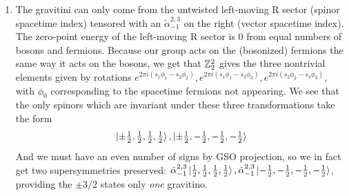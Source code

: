 \documentclass[11pt, class=article, crop=false]{standalone}
\begin{document}
\begin{enumerate}
	To obtain a nonzero result we thus need to act with $\d_\nu^2$. On these terms for each $h,g$. First note that for $h=g=0$ \eqref{eq:thetaid} vanishes as $\nu^4$ so will not contribute. For $(h,g) \neq (0,0)$, the terms vanish as $\nu^2$ due to the $\theta^2 \twist11$, exactly cancellable by taking two derivatives on that term. Thus, we need only worry about the zeroth order behavior of everything else: $\xi \sim 1$ and $\theta\twist{1-h}{1-g} \theta \twist{1+h}{1+g} (\nu/2) \sim \theta\twist{1-h}{1-g} \theta \twist{1+h}{1+g} (0)$. We are left with 
	\[
	\begin{aligned}
		&-\frac{\pi^2}{4} \frac{1}{(2 \pi)^2} \frac12 \sum_{h,g \neq (0,0)} \frac{\Gamma_{2,18} \twist hg}{\tau_2 \eta^{8} \bar \eta^{20}} \frac{ 16 \eta^2 \bar \eta^2}{\theta^2 \twist{1-h}{1-g} \bar \theta^2 \twist{1-h}{1-g}} \theta\twist{1-h}{1-g} \theta \twist{1+h}{1+g} \big(\d_\nu \theta \twist11_{\nu = 0}\big)^2\\
		&= -\frac{4 \eta^6}{2 \tau_2 \eta^6 \bar \eta^{18}} \left[\frac{\Gamma_{2,18} \twist11 }{\bar \theta^2 \twist00} + \frac{\Gamma_{2,18} \twist10 }{\bar \theta^2 \twist01} -
		\frac{\Gamma_{2,18} \twist01 }{\bar \theta^2 \twist10} \right]
	\end{aligned}
	\]
	Where we have used $\theta \twist 12 = - \theta \twist10$, as well as $\theta_1'|_{\nu = 0} = 2 \eta^3$ 
	We now use the identity
	\[
		\bar \theta_2 \bar \theta_3 \bar \theta_4 = 2 \bar \eta^3
	\]
	
	and recover
	\[
		\tau_2 B_2 = - \frac{\Gamma_{2,18} \twist11 \bar \theta_2 \bar \theta_3}{\bar \eta^{24}} - \frac{ \Gamma_{2,18} \twist 10 \bar \theta_2 \bar \theta_3}{\bar \eta^{24}} +\frac{ \Gamma_{2,18} \twist 01 \bar \theta_3 \bar \theta_4}{\bar \eta^{24}}.
	\]
	
	\item The gravitini can only come from the untwisted left-moving R sector (spinor spacetime index) tensored with an $\tilde \alpha^{2,3}_{-1}$ on the right (vector spacetime index). The zero-point energy of the left-moving R sector is $0$ from equal numbers of bosons and fermions. Because our group acts on the (bosonized) fermions the same way it acts on the bosons, we get that $\mathbb{Z}_2^2$ gives the three nontrivial elements given by rotations $e^{2 \pi i (s_1 \phi_1 - s_2 \phi_2)}, e^{2 \pi i (s_1 \phi_1 - s_3 \phi_3)}, e^{2 \pi i (s_2 \phi_2 - s_3 \phi_3)}$, with $\phi_0$ corresponding to the spacetime fermions not appearing. We see that the only spinors which are invariant under these three transformations take the form
	\[
		\ket{\pm \tfrac12, \tfrac12, \tfrac12, \tfrac12}, \ket{\pm \tfrac12, -\tfrac12, -\tfrac12, -\tfrac12}
	\]
	And we must have an even number of signs by GSO projection, so we in fact get two supersymmetries preserved: $\tilde \alpha^{2,3}_{-1} \ket{\frac12,\frac12,\frac12,\frac12}, \tilde \alpha^{2,3}_{-1} \ket{-\frac12,-\frac12,-\frac12,-\frac12}$, providing the $\pm 3/2$ states only \emph{one} gravitino. 
	

\end{enumerate}
\end{document}

